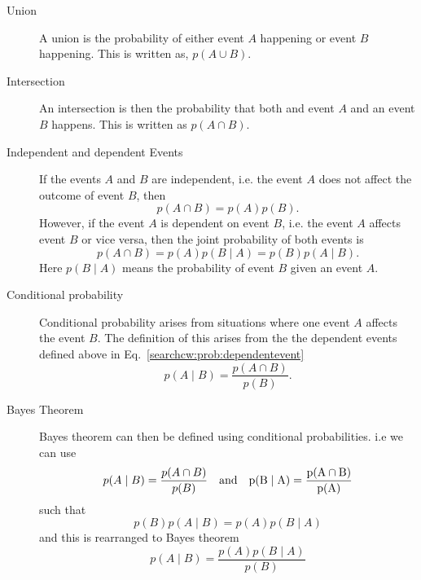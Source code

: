 \begin{description}
	\item [Union]
	A union is the probability of either event $A$ happening or event $B$ happening. This is written as, $p(A \cup B)$.
	
	\item [Intersection]
	An intersection is then the probability that both and event $A$ and an event $B$ happens. This is written as $p(A \cap B)$.
	
	\item [Independent and dependent Events]
	If the events $A$ and $B$ are independent, i.e. the event $A$ does not affect the outcome of event $B$, then
	\begin{equation}
	p(A \cap B) = p(A)p(B).
	\end{equation}
	However, if the event $A$ is dependent on event $B$, i.e. the event $A$ affects event $B$ or vice versa, then the joint probability of both events is
	\begin{equation}
	\label{searchcw:prob:dependentevent}
	p(A \cap B) = p(A)p(B \mid A) = p(B)p(A \mid B).
	\end{equation}
	Here $p(B \mid A)$ means the probability of event $B$ given an event $A$.
	
	\item [Conditional probability]
	Conditional probability arises from situations where one event $A$ affects the event $B$.
	The definition of this arises from the the dependent events defined above in Eq.~\ref{searchcw:prob:dependentevent}
	\begin{equation}
	p(A \mid B) = \frac{p(A \cap B)}{p(B)}.
	\end{equation}
	
	\item [Bayes Theorem]
	Bayes theorem can then be defined using conditional probabilities. i.e we can use
	\begin{equation}
	p(A \mid B) = \frac{p(A \cap B)}{p(B)} \quad \rm{and} \quad p(B \mid A) = \frac{p(A \cap B)}{p(A)}
	\end{equation}
	such that
	\begin{equation}
	p(B)p(A \mid B) = p(A)p(B \mid A)
	\end{equation}
	and this is rearranged to Bayes theorem
	\begin{equation}
	\label{searchcw:prob:bayes}
	p(A \mid B) = \frac{p(A)p(B \mid A)}{p(B)}
	\end{equation}
	
\end{description}

